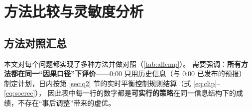 \documentclass[12pt,a4paper,fontset=fandol]{ctexart}
\begin{document}
\section{方法比较与灵敏度分析}
\label{sec:compare}

\subsection{方法对照汇总}

本文对每个问题都实现了多种方法并做对照（\cref{tab:allcmp}\nobreak）\nobreak。
需要强调\nobreak：\textbf{所有方法都在同一“因果口径\nobreak”下评价}——0:00 只用历史信息（与 0:00 已发布的预报\nobreak）
制定计划\nobreak，日内按第 \ref{sec:q2} 节的实时平衡控制规则结算（式 \eqref{eq:clip}--\eqref{eq:socrec}\nobreak）\nobreak，
因此表中每一行的数字都是\textbf{可实行的策略}在同一信息结构下的成绩\nobreak，不存在“事后调整\nobreak”带来的虚优\nobreak。
\end{document}
